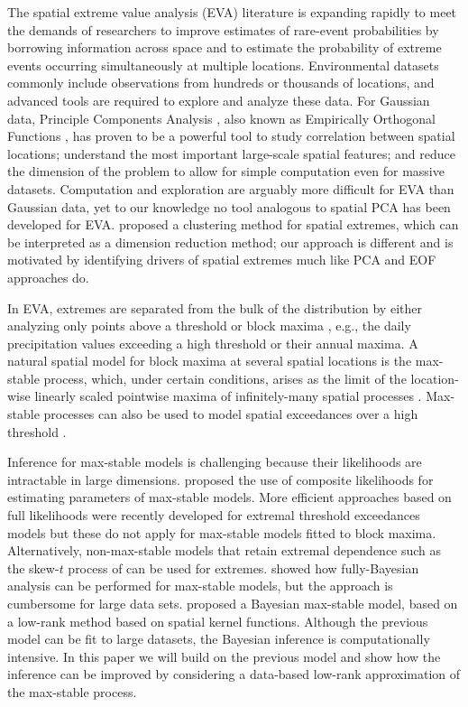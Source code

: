 \documentclass[12pt]{article}
\begin{document}
The spatial extreme value analysis (EVA) literature is expanding rapidly \citep[see, e.g.,][]{Davison2012,Davison2013,Dey.Yan:2015} to meet the demands of researchers to improve estimates of rare-event probabilities by borrowing information across space and to estimate the probability of extreme events occurring simultaneously at multiple locations.
Environmental datasets commonly include observations from hundreds or thousands of locations, and advanced tools are required to explore and analyze these data. 
For Gaussian data, Principle Components Analysis \citep[PCA,][]{Everitt2008}, also known as Empirically Orthogonal Functions \citep[EOFs,][]{Toggweiler2001}, has proven to be a powerful tool to study correlation between spatial locations; understand the most important large-scale spatial features; and reduce the dimension of the problem to allow for simple computation even for massive datasets.
Computation and exploration are arguably more difficult for EVA than Gaussian data, yet to our knowledge no tool analogous to spatial PCA has been developed for EVA. \citet{Bernard2013} proposed a clustering method for spatial extremes, which can be interpreted as a dimension reduction method; our approach is different and is motivated by identifying drivers of spatial extremes much like PCA and EOF approaches do. 

In EVA, extremes are separated from the bulk of the distribution by either analyzing only points above a threshold or block maxima \citep{Coles2001}, e.g., the daily precipitation values exceeding a high threshold or their annual maxima.
A natural spatial model for block maxima at several spatial locations is the max-stable process, which, under certain conditions, arises as the limit of the location-wise linearly scaled pointwise maxima of infinitely-many spatial processes \citep[Chapter~9]{deHaan2006}.
Max-stable processes can also be used to model spatial exceedances over a high threshold \citep{Thibaud2013,Huser2014}.

Inference for max-stable models is challenging because their likelihoods are intractable in large dimensions. \citet{Padoan2010} proposed the use of composite likelihoods for estimating parameters of max-stable models. More efficient approaches based on full likelihoods were recently developed for extremal threshold exceedances models \citep{Wadsworth2014,Engelke2015,Thibaud2013a} but these do not apply for max-stable models fitted to block maxima. Alternatively, non-max-stable models that retain extremal dependence such as the skew-$t$ process of \citet{Morris2016} can be used for extremes. \citet{Thibaud2015} showed how fully-Bayesian analysis can be performed for max-stable models, but the approach is cumbersome for large data sets. \citet{Reich2012} proposed a Bayesian max-stable model, based on a low-rank method based on spatial kernel functions. Although the previous model can be fit to large datasets, the Bayesian inference is computationally intensive. In this paper we will build on the previous model and show how the inference can be improved by considering a data-based low-rank approximation of the max-stable process.
\end{document}
